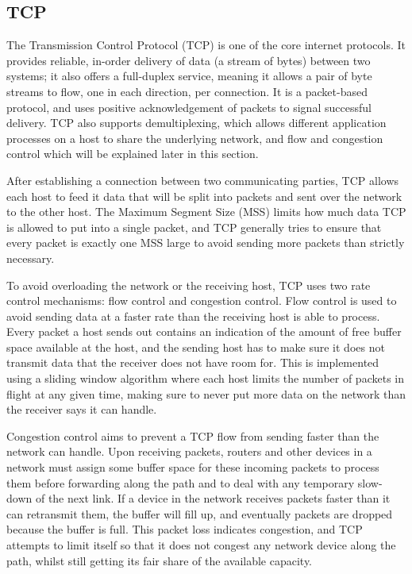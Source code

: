 \subsection{TCP}
\label{sec:bg:tcp}
The Transmission Control Protocol (TCP) is one of the core internet protocols.
It provides reliable, in-order delivery of data (a stream of bytes) between two
systems; it also offers a full-duplex service, meaning it allows a pair of byte
streams to flow, one in each direction, per connection. It is a packet-based
protocol, and uses positive acknowledgement of packets to signal successful
delivery. TCP also supports demultiplexing, which allows different application
processes on a host to share the underlying network, and flow and congestion
control which will be explained later in this section.

After establishing a connection between two communicating parties, TCP allows
each host to feed it data that will be split into packets and sent over the
network to the other host. The Maximum Segment Size (MSS) limits how much data
TCP is allowed to put into a single packet, and TCP generally tries to ensure
that every packet is exactly one MSS large to avoid sending more packets than
strictly necessary.

To avoid overloading the network or the receiving host, TCP uses two rate
control mechanisms: flow control and congestion control. Flow control is used to
avoid sending data at a faster rate than the receiving host is able to process.
Every packet a host sends out contains an indication of the amount of free
buffer space available at the host, and the sending host has to make sure it
does not transmit data that the receiver does not have room for. This is
implemented using a sliding window algorithm where each host limits the number
of packets in flight at any given time, making sure to never put more data on
the network than the receiver says it can handle.

Congestion control aims to prevent a TCP flow from sending faster than the
network can handle. Upon receiving packets, routers and other devices in a
network must assign some buffer space for these incoming packets to process them
before forwarding along the path and to deal with any temporary slow-down of the
next link. If a device in the network receives packets faster than it can
retransmit them, the buffer will fill up, and eventually packets are dropped
because the buffer is full. This packet loss indicates congestion, and TCP
attempts to limit itself so that it does not congest any network device along
the path, whilst still getting its fair share of the available capacity.

